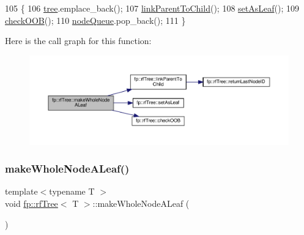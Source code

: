 \begin{DoxyCode}
105                                                 \{
106                     \hyperlink{classtree}{tree}.emplace\_back();
107                     \hyperlink{classfp_1_1rfTree_aceaedc5d54bb429c1a3539f164a93d45}{linkParentToChild}();
108                     \hyperlink{classfp_1_1rfTree_a3583e1f1659ba9a9013a4891709bacb9}{setAsLeaf}();
109                     \hyperlink{classfp_1_1rfTree_a45e47b318c90a1359840ab6161f20ab1}{checkOOB}();
110                     \hyperlink{classfp_1_1rfTree_af72d0a2f930fd480dfb4858885c2df23}{nodeQueue}.pop\_back();
111                 \}
\end{DoxyCode}
Here is the call graph for this function\+:
\nopagebreak
\begin{figure}[H]
\begin{center}
\leavevmode
\includegraphics[width=350pt]{classfp_1_1rfTree_a2b2a47186c0784415609f1c9b005e702_cgraph}
\end{center}
\end{figure}
\mbox{\label{classfp_1_1rfTree_a2b2a47186c0784415609f1c9b005e702}} 
\subsubsection{\texorpdfstring{make\+Whole\+Node\+A\+Leaf()}{makeWholeNodeALeaf()}\hspace{0.1cm}{\footnotesize\ttfamily [2/2]}}
{\footnotesize\ttfamily template$<$typename T $>$ \\
void \hyperlink{classfp_1_1rfTree}{fp\+::rf\+Tree}$<$ T $>$\+::make\+Whole\+Node\+A\+Leaf (\begin{DoxyParamCaption}{ }\end{DoxyParamCaption})\hspace{0.3cm}{\ttfamily [inline]}}



